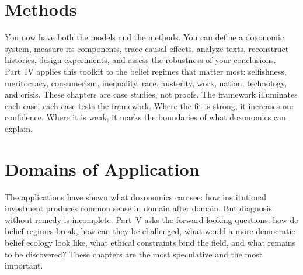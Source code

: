 \documentclass[11pt,a4paper,openright,twoside]{memoir}
\begin{document}
\part{Methods}
\label{part:methods}










\begin{interlude}
You now have both the models and the methods.
You can define a doxonomic system, measure its components, trace causal effects, analyze texts, reconstruct histories, design experiments, and assess the robustness of your conclusions.
Part~IV applies this toolkit to the belief regimes that matter most: selfishness, meritocracy, consumerism, inequality, race, austerity, work, nation, technology, and crisis.
These chapters are case studies, not proofs.
The framework illuminates each case; each case tests the framework.
Where the fit is strong, it increases our confidence.
Where it is weak, it marks the boundaries of what doxonomics can explain.
\end{interlude}

\part{Domains of Application}
\label{part:applications}












\begin{interlude}
The applications have shown what doxonomics can see: how institutional investment produces common sense in domain after domain.
But diagnosis without remedy is incomplete.
Part~V asks the forward-looking questions: how do belief regimes break, how can they be challenged, what would a more democratic belief ecology look like, what ethical constraints bind the field, and what remains to be discovered?
These chapters are the most speculative and the most important.
\end{interlude}
\end{document}

